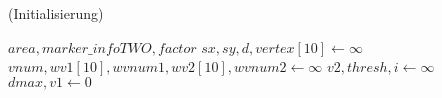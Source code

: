 \begin{algorithm}[!ht]\small
\caption{ (Initialisierung)}
\label{alg:checksquare-1}
\begin{algorithmic}[1]
	\Require $\mathit{area}, \mathit{marker\_infoTWO}, \mathit{factor}$
	\State $\mathit{sx}, \mathit{sy}, d, \mathit{vertex}[10] \gets \infty$
	\State $\mathit{vnum}, \mathit{wv1}[10], \mathit{wvnum1}, \mathit{wv2}[10], \mathit{wvnum2} \gets \infty$
	\State $\mathit{v2}, \mathit{thresh}, i \gets \infty$
	\State $\mathit{dmax},\mathit{v1} \gets 0$
\end{algorithmic}
\end{algorithm}
